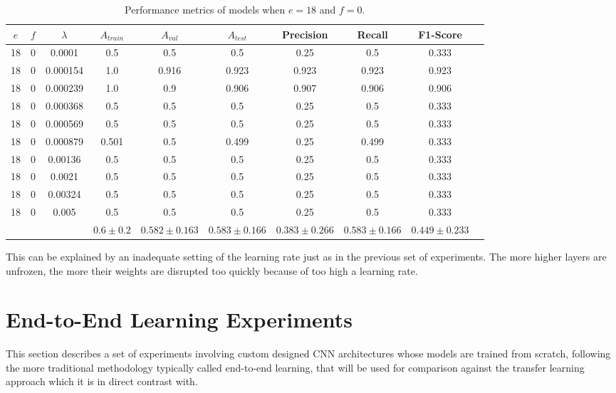 \begin{table}[ht]
\centering
\begin{tabular}{ |c|c|c|c|c|c|c|c|c|c| }
\hline
$e$ & $f$ & $\lambda$ & $A_{train}$ & $A_{val}$ & $A_{test}$ & Precision & Recall & F1-Score \\
\hline
18 & 0 & 0.0001 & 0.5 & 0.5 & 0.5 & 0.25 & 0.5 & 0.333 \\
18 & 0 & 0.000154 & 1.0 & 0.916 & 0.923 & 0.923 & 0.923 & 0.923 \\
18 & 0 & 0.000239 & 1.0 & 0.9 & 0.906 & 0.907 & 0.906 & 0.906 \\
18 & 0 & 0.000368 & 0.5 & 0.5 & 0.5 & 0.25 & 0.5 & 0.333 \\
18 & 0 & 0.000569 & 0.5 & 0.5 & 0.5 & 0.25 & 0.5 & 0.333 \\
18 & 0 & 0.000879 & 0.501 & 0.5 & 0.499 & 0.25 & 0.499 & 0.333 \\
18 & 0 & 0.00136 & 0.5 & 0.5 & 0.5 & 0.25 & 0.5 & 0.333 \\
18 & 0 & 0.0021 & 0.5 & 0.5 & 0.5 & 0.25 & 0.5 & 0.333 \\
18 & 0 & 0.00324 & 0.5 & 0.5 & 0.5 & 0.25 & 0.5 & 0.333 \\
18 & 0 & 0.005 & 0.5 & 0.5 & 0.5 & 0.25 & 0.5 & 0.333 \\
\hline
 & & & $0.6\pm0.2$ & $0.582\pm0.163$ & $0.583\pm0.166$ & $0.383\pm0.266$ & $0.583\pm0.166$ & $0.449\pm0.233$ \\
\hline
\end{tabular}
\caption{Performance metrics of models when $e = 18$ and $f = 0$.}
\label{table:vgg16_finetuning_0}
\end{table}

This can be explained by an inadequate setting of the learning rate just as in the previous set of experiments. The more higher layers are unfrozen, the more their weights are disrupted too quickly because of too high a learning rate.

\section{End-to-End Learning Experiments}

This section describes a set of experiments involving custom designed \ac{CNN} architectures whose models are trained from scratch, following the more traditional methodology typically called end-to-end learning, that will be used for comparison against the transfer learning approach which it is in direct contrast with.

